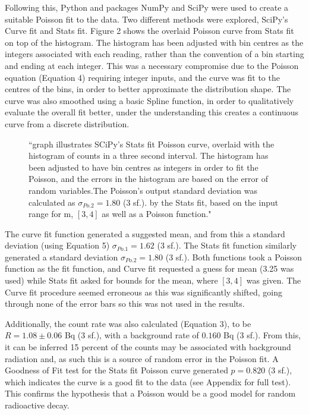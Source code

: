 \documentclass[11pt]{article}
\begin{document}
\noindent Following this, Python and packages NumPy and SciPy were used to create a suitable Poisson fit to the data. Two different methods were explored, SciPy's Curve fit and Stats fit. 
Figure 2 shows the overlaid Poisson curve from Stats fit on top of the histogram. The histogram has been adjusted with bin centres as the integers associated with each reading, rather than the convention of a bin starting and ending at each integer. This was a necessary compromise due to the Poisson equation (Equation 4) requiring integer inputs, and the curve was fit to the centres of the bins, in order to better approximate the distribution shape. The curve was also smoothed using a basic Spline function, in order to qualitatively evaluate the overall fit better, under the understanding this creates a continuous curve from a discrete distribution.
\begin{figure}[h]
        \begin{center}
            \def\svgwidth{\columnwidth}
            
             \caption{“graph illustrates SCiPy's Stats fit Poisson curve, overlaid with the histogram of counts in a three second interval. The histogram has been adjusted to have bin centres as integers in order to fit the Poisson, and the errors in the histogram are based on the error of random variables.The Poisson's output standard deviation was calculated as $\sigma_{Po.2} = 1.80$ (3 sf.). by the Stats fit,  based on the input range for m, $[3,4]$ as well as a Poisson function."}
             \label{fig:experimental results 1}
             \vspace{-1.5em}
        \end{center}
    \end{figure}
\noindent The curve fit function generated a suggested mean, and from this a standard deviation (using Equation 5) $\sigma_{Po.1} = 1.62$ (3 sf.). The Stats fit function similarly generated a standard deviation $\sigma_{Po.2} = 1.80 $ (3 sf.). Both functions took a Poisson function as the fit function, and Curve fit requested a guess for mean (3.25 was used) while Stats fit asked for bounds for the mean, where $[3,4]$ was given. The Curve fit procedure seemed erroneous as this was significantly shifted, going through none of the error bars so this was not used in the results. 

\noindent Additionally, the count rate was also calculated (Equation 3), to be $R = 1.08 \pm 0.06$ Bq (3 sf.), with a background rate of $0.160$ Bq (3 sf.). From this, it can be inferred 15 percent of the counts may be associated with background radiation and, as such this is a source of random error in the Poisson fit.
A Goodness of Fit test for the Stats fit Poisson curve generated $p = 0.820$ (3 sf.), which indicates the curve is a good fit to the data (see Appendix for full test). This confirms the hypothesis that a Poisson would be a good model for random radioactive decay. 
\end{document}
